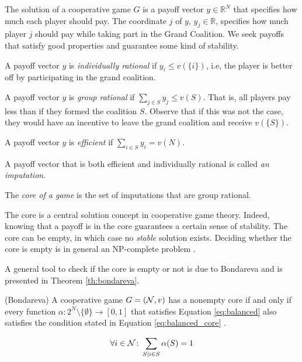 The solution of a cooperative game $G$ is a payoff vector $y \in \mathbb{R}^N$ that specifies how much each player should pay. The coordinate $j$ of $y$, $y_j \in \mathbb{R}$, specifies how much player $j$ should pay while taking part in the Grand Coalition. We seek payoffs that satisfy good properties and guarantee some kind of stability.

\begin{definition}\label{def:pg_ir}
  A payoff vector $y$ is {\em individually rational} if $y_i \leq v(\{i\})$, i.e, the player is better off by participating in the grand coalition.
\end{definition}

\begin{definition}\label{def:pf_gr}
  A payoff vector $y$ is {\em group rational} if $\sum_{j \in S} y_j \leq v(S)$. That is, all players pay less than if they formed the coalition $S$. Observe that if this was not the case, they would have an incentive to leave the grand coalition and receive $v(\{S\})$.
\end{definition}

\begin{definition}\label{def:pf_eff}
 A payoff vector $y$ is {\em efficient} if $\sum_{i \in S} y_i = v(N)$.
\end{definition}

\begin{definition}\label{def:imputation}
  A payoff vector that is both efficient and individually rational is called {\em an imputation}.
\end{definition}

\begin{definition}\label{def:core}
  The {\em core of a game} is the set of imputations that are group rational.
\end{definition}

The core is a central solution concept in cooperative game theory. Indeed, knowing that a payoff is in the core guarantees a certain sense of stability.
The core can be empty, in which case no \textit{stable} solution exists. Deciding whether the core is empty is in general an NP-complete problem \cite{deng1994complexity}.

A general tool to check if the core is empty or not is due to Bondareva and is presented in Theorem \ref{th:bondareva}.

\begin{theorem}\label{th:bondareva}
 (Bondareva) A cooperative game $G = (\mathcal{N}, v)$ has a nonempty core if and only if every function $\alpha \colon 2^N \setminus \{\emptyset\} \to [0, 1]$ that satisfies Equation \eqref{eq:balanced} also satisfies the condition stated in Equation \eqref{eq:balanced_core} \cite{bondareva}.

\begin{equation}
\label{eq:balanced}
\forall i \in \N \colon \sum_{S|i \in S} \alpha(S) = 1
\end{equation}
\end{theorem}

